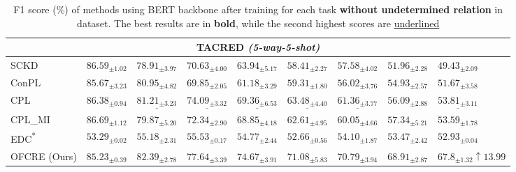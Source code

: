 \begin{table*}[ht]
\begin{adjustbox}{width=\textwidth}
\begin{tabular}{lllllllll}
\toprule
\multicolumn{9}{c}{\textbf{TACRED} \textit{(5-way-5-shot)}} \\
\midrule
SCKD     & \underline{$86.59_{\pm 1.02}$} & $78.91_{\pm 3.97}$ & $70.63_{\pm 4.00}$ & $63.94_{\pm 5.17}$ & $58.41_{\pm 2.27}$ & $57.58_{\pm 4.02}$ & $51.96_{\pm 2.28}$ & $49.43_{\pm 2.09}$ \\
ConPL & {${85.67_{\pm 3.23}}$} & $80.95_{\pm 4.82}$ & $69.85_{\pm 2.05}$ & $61.18_{\pm 3.29}$ & $59.31_{\pm 1.80}$ & $56.02_{\pm 3.76}$ & $54.93_{\pm 2.57}$ & $51.67_{\pm 3.58}$ \\ 
CPL & $86.38_{\pm 0.94}$ & $\underline{81.21_{\pm 3.23}}$ & $\underline{74.09_{\pm 3.32}}$ & $\underline{69.36_{\pm 6.53}}$ & $\underline{63.48_{\pm 4.40}}$ & $\underline{61.36_{\pm 3.77}}$ & $56.09_{\pm 2.88}$ & $\underline{53.81_{\pm 3.11}}$ \\
CPL\_MI  & $\mathbf{86.69_{\pm 1.12}}$ & {$79.87_{\pm 5.20}$} & {$72.34_{\pm 2.90}$} & {$68.85_{\pm 4.18}$} & {$62.61_{\pm 4.95}$} & {$60.05_{\pm 4.66}$} & \underline{$57.34_{\pm 5.21}$} & {$53.59_{\pm 1.78}$} \\ 
EDC\textsuperscript{*}  & $53.29_{\pm 0.02}$ & {$55.18_{\pm 2.31}$} & {$55.53_{\pm 0.17}$} & {$54.77_{\pm 2.44}$} & {$52.66_{\pm 0.56}$} & {$54.10_{\pm 1.87}$} & {$53.47_{\pm 2.42}$} & {$52.93_{\pm 0.04}$} \\%
OFCRE (Ours)& $85.23_{\pm 0.39}$ & $\mathbf{82.39_{\pm 2.78}}$ & $\mathbf{77.64_{\pm 3.39}}$ & $\mathbf{74.67_{\pm 3.91}}$ & $\mathbf{71.08_{\pm 5.83}}$ & $\mathbf{70.79_{\pm 3.94}}$ & $\mathbf{68.91_{\pm 2.87}}$ & $\mathbf{67.8_{\pm 1.32}}${\color{darkgreen}\footnotesize  $\uparrow{13.99}$} \\

\toprule
\end{tabular}
\end{adjustbox}
\caption{F1 score (\%) of methods using BERT backbone after training for each task \textbf{without undetermined relation} in dataset. The best results are in \textbf{bold}, while the second highest scores are \underline{underlined}}
\label{table:main_wo_ur}
\end{table*}

